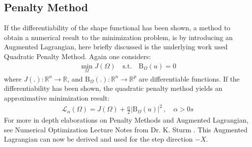 \subsection*{Penalty Method}
If the differentiability of the shape functional has been shown, a method to obtain a numerical result to the minimization problem,
is by introducing an Augmented Lagrangian, here briefly discussed is the underlying work used Quadratic Penalty Method. Again one considers:
\begin{align*}
    \min_{ \Omega} J( \Omega) \quad \text{s.t.} \quad \mathrm{B}_{\Omega}(u) = 0
\end{align*}
where $J(.) : \mathbb{R}^n \rightarrow \mathbb{R}$, and $\mathrm{B}_{\Omega}(.):\mathbb{R}^n \rightarrow \mathbb{R}^p$ are differentiable functions.
If the differentiability has been shown, the quadratic penalty method yields an approximative minimization result:
\begin{align*}
    \mathcal{L}_{\alpha}(\Omega) = J(\Omega) + \frac{\alpha}{2}|\mathrm{B}_{\Omega}(u)|^2 \, , \quad \alpha > 0s
\end{align*}
For more in depth elaborations on Penalty Methods and Augmented Lagrangian, 
see Numerical Optimization Lecture Notes from Dr. K. Sturm \cite{lecture_notes_sturm}. This Augmented Lagrangian can now be derived 
and used for the step direction $-X$.